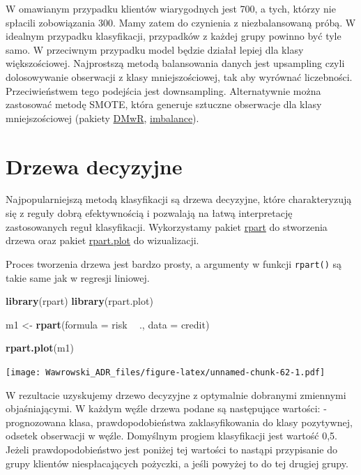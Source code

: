 \documentclass[
]{book}
\newenvironment{Shaded}{\begin{snugshade}}{\end{snugshade}}
\newcommand{\DataTypeTok}[1]{\textcolor[rgb]{0.13,0.29,0.53}{#1}}
\newcommand{\KeywordTok}[1]{\textcolor[rgb]{0.13,0.29,0.53}{\textbf{#1}}}
\newcommand{\NormalTok}[1]{#1}
\newcommand{\OperatorTok}[1]{\textcolor[rgb]{0.81,0.36,0.00}{\textbf{#1}}}
\newcommand{\StringTok}[1]{\textcolor[rgb]{0.31,0.60,0.02}{#1}}
\begin{document}
W omawianym przypadku klientów wiarygodnych jest 700, a tych, którzy nie spłacili zobowiązania 300. Mamy zatem do czynienia z niezbalansowaną próbą. W idealnym przypadku klasyfikacji, przypadków z każdej grupy powinno być tyle samo. W przeciwnym przypadku model będzie działał lepiej dla klasy większościowej. Najprostszą metodą balansowania danych jest upsampling czyli dolosowywanie obserwacji z klasy mniejszościowej, tak aby wyrównać liczebności. Przeciwieństwem tego podejścia jest downsampling. Alternatywnie można zastosować metodę SMOTE, która generuje sztuczne obserwacje dla klasy mniejszościowej (pakiety \href{https://cran.r-project.org/web/packages/DMwR/index.html}{DMwR}, \href{https://cran.r-project.org/web/packages/imbalance/index.html}{imbalance}).

\hypertarget{drzewa-decyzyjne}{%
\section{Drzewa decyzyjne}\label{drzewa-decyzyjne}}

Najpopularniejszą metodą klasyfikacji są drzewa decyzyjne, które charakteryzują się z reguły dobrą efektywnością i pozwalają na łatwą interpretację zastosowanych reguł klasyfikacji. Wykorzystamy pakiet \href{https://cran.r-project.org/web/packages/rpart/index.html}{rpart} do stworzenia drzewa oraz pakiet \href{https://cran.r-project.org/web/packages/rpart.plot/index.html}{rpart.plot} do wizualizacji.

Proces tworzenia drzewa jest bardzo prosty, a argumenty w funkcji \texttt{rpart()} są takie same jak w regresji liniowej.

\begin{Shaded}
\begin{Highlighting}[]
\KeywordTok{library}\NormalTok{(rpart)}
\KeywordTok{library}\NormalTok{(rpart.plot)}

\NormalTok{m1 <-}\StringTok{ }\KeywordTok{rpart}\NormalTok{(}\DataTypeTok{formula =}\NormalTok{ risk }\OperatorTok{~}\StringTok{ }\NormalTok{., }\DataTypeTok{data =}\NormalTok{ credit)}

\KeywordTok{rpart.plot}\NormalTok{(m1)}
\end{Highlighting}
\end{Shaded}

\texttt{[image: Wawrowski\_ADR\_files/figure-latex/unnamed-chunk-62-1.pdf]}

W rezultacie uzyskujemy drzewo decyzyjne z optymalnie dobranymi zmiennymi objaśniającymi. W każdym węźle drzewa podane są następujące wartości: - prognozowana klasa, prawdopodobieństwa zaklasyfikowania do klasy pozytywnej, odsetek obserwacji w węźle. Domyślnym progiem klasyfikacji jest wartość 0,5. Jeżeli prawdopodobieństwo jest poniżej tej wartości to nastąpi przypisanie do grupy klientów niespłacających pożyczki, a jeśli powyżej to do tej drugiej grupy.
\end{document}

